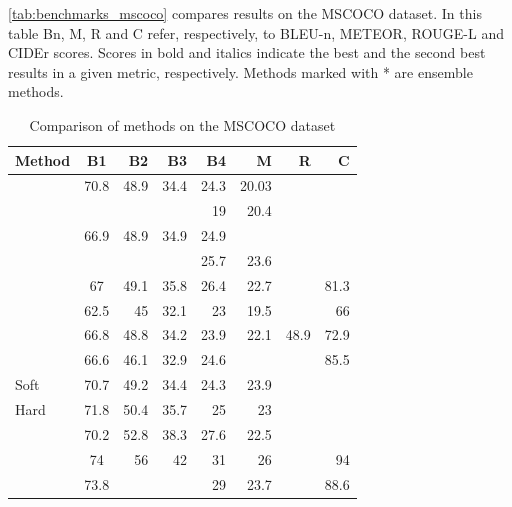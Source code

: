 \cref{tab:benchmarks_mscoco} compares results on the MSCOCO dataset. In this table Bn, M, R and C refer, respectively, to BLEU-n, METEOR, ROUGE-L and CIDEr scores. Scores in bold and italics indicate the best and the second best results in a given metric, respectively. Methods marked with * are ensemble methods.

\clearpage
\begin{table}[ht]
\caption{Comparison of methods on the MSCOCO dataset}
\begin{tabular}{lcrrrrrr}
    \toprule
    Method    &    B1    &    B2    &    B3    &    B4    &    M    &   R   &    C \\
    \midrule
    \citet{Kiros2014_LBL}    &    70.8    &    48.9    &    34.4    &    24.3    &    20.03    &        &        \\
    \citet{Chen2015}    &        &        &        &    19    &    20.4    &        &        \\
    \citet{Donahue2015}    &    66.9    &    48.9    &    34.9    &    24.9    &        &        &        \\
    \citet{Fang2015}    &        &        &        &    25.7    &    23.6    &        &        \\
    \citet{Jia2015}    &    67    &    49.1    &    35.8    &    26.4    &    22.7    &        &    81.3    \\
    \citet{Karpathy2015}    &    62.5    &    45    &    32.1    &    23    &    19.5    &        &    66    \\
    \citet{Mao2015_mRNN}    &    66.8    &    48.8    &    34.2    &    23.9    &    22.1    &    48.9    &    72.9    \\
    \citet{Vinyals2015}    &    66.6    &    46.1    &    32.9    &    24.6    &        &        &    85.5    \\
    \citet{Xu2015} Soft    &    70.7    &    49.2    &    34.4    &    24.3    &    23.9    &        &        \\
    \citet{Xu2015} Hard    &    71.8    &    50.4    &    35.7    &    25    &    23    &        &        \\
    \citet{Oruganti2016}    &    70.2    &    52.8    &    38.3    &    27.6    &    22.5    &        &        \\
    \citet{Wu2016}    &    74    &    56    &    42    &    31    &    26    &        &    94    \\
    \citet{Yang2016_RevNet}    &    73.8    &        &        &    29    &    23.7    &        &    88.6    \\

\end{tabular}
\end{table}
